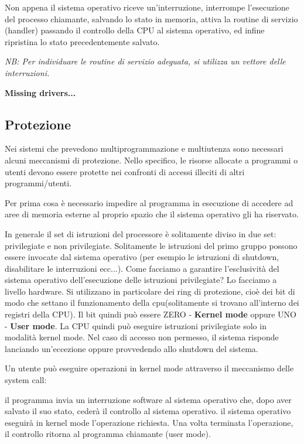 \documentclass{article}
\begin{document}
\noindent Non appena il sistema operativo riceve un’interruzione, interrompe l’esecuzione del processo 
chiamante, salvando lo stato in memoria, attiva la routine di servizio (handler) 
passando il controllo della CPU al sistema operativo, ed infine ripristina lo stato
precedentemente salvato.
\medskip

\noindent\textit{NB: Per individuare le routine di servizio adeguata, si utilizza un vettore delle interruzioni.}

\textbf{Missing drivers...}

\subsection{Protezione}
Nei sistemi che prevedono multiprogrammazione e multiutenza sono necessari alcuni meccanismi 
di protezione. Nello specifico, le risorse allocate a programmi o utenti devono essere protette 
nei confronti di accessi illeciti di altri programmi/utenti.

\noindent Per prima cosa è necessario impedire al programma in esecuzione di accedere ad aree 
di memoria esterne al proprio spazio che il sistema operativo gli ha riservato. 

\noindent In generale il set di istruzioni del processore è solitamente diviso in due set: 
privilegiate e non privilegiate. Solitamente le istruzioni del primo gruppo possono essere invocate
 dal sistema operativo (per esempio le istruzioni di shutdown, disabilitare le interruzioni ecc...).
Come facciamo a garantire l'esclusività del sistema operativo dell'esecuzione delle istruzioni 
privilegiate? Lo facciamo a livello hardware. Si utilizzano in particolare dei ring di protezione,
cioè dei bit di modo che settano il funzionamento della cpu(solitamente si trovano all'interno dei
registri della CPU). Il  bit quindi può essere ZERO - \textbf{Kernel mode} oppure UNO - \textbf{User mode}. La CPU 
quindi può eseguire istruzioni privilegiate solo in modalità kernel mode. Nel caso di accesso
non permesso, il sistema risponde lanciando un'eccezione oppure provvedendo allo shutdown del 
sistema.
\medskip

\noindent Un utente può eseguire operazioni in kernel mode attraverso il meccanismo delle 
system call:

\noindent il programma invia un interruzione software al sistema operativo che, dopo aver salvato il suo
stato, cederà il controllo al sistema operativo. il sistema operativo eseguirà in kernel 
mode l'operazione richiesta. Una volta terminata l'operazione, il controllo ritorna al
programma chiamante (user mode).
\end{document}
